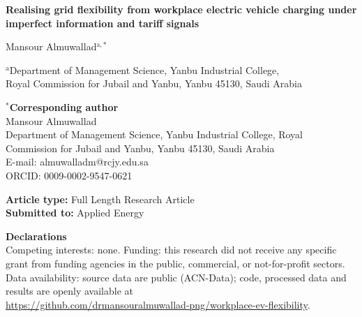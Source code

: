 \documentclass[preprint,11pt]{elsarticle}
\begin{document}
\begin{titlepage}
\begin{center}
{\Large\bfseries Realising grid flexibility from workplace electric vehicle charging under imperfect information and tariff signals\par}
\vspace{1.5cm}
{\large Mansour Almuwallad$^{\mathrm{a},*}$\par}
\vspace{0.4cm}
$^{\mathrm{a}}$Department of Management Science, Yanbu Industrial College,\\
Royal Commission for Jubail and Yanbu, Yanbu 45130, Saudi Arabia\par
\end{center}
\vspace{1.5cm}
\noindent\textbf{$^{*}$Corresponding author}\\
Mansour Almuwallad\\
Department of Management Science, Yanbu Industrial College, Royal Commission for Jubail and Yanbu, Yanbu 45130, Saudi Arabia\\
E-mail: almuwalladm@rcjy.edu.sa\\
ORCID: 0009-0002-9547-0621

\vspace{1cm}
\noindent\textbf{Article type:} Full Length Research Article\\
\textbf{Submitted to:} Applied Energy

\vspace{1cm}
\noindent\textbf{Declarations}\\
Competing interests: none. Funding: this research did not receive any specific grant from funding agencies in the public, commercial, or not-for-profit sectors. Data availability: source data are public (ACN-Data); code, processed data and results are openly available at\\ {\small\url{https://github.com/drmansouralmuwallad-png/workplace-ev-flexibility}}.
\end{titlepage}
\setcounter{page}{1}
\end{document}
